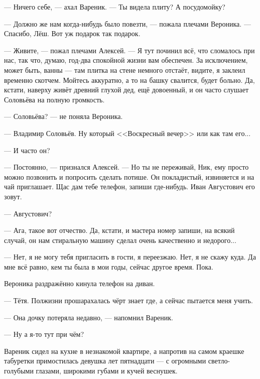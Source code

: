 \textspace

--- Ничего себе, --- ахал Вареник.
--- Ты видела плиту?
А посудомойку?

--- Должно же нам когда-нибудь было повезти, --- пожала плечами Вероника.
--- Спасибо, Лёш.
Вот уж подарок так подарок.

--- Живите, --- пожал плечами Алексей.
--- Я тут починил всё, что сломалось при нас, так что, думаю, год-два спокойной жизни вам обеспечен.
За исключением, может быть, ванны --- там плитка на стене немного отстаёт, видите, я заклеил временно скотчем.
Мойтесь аккуратно, а то на башку свалится, будет больно.
Да, кстати, наверху живёт древний глухой дед, ещё довоенный, и он часто слушает Соловьёва на полную громкость.

--- Соловьёва? --- не поняла Вероника.

--- Владимир Соловьёв.
Ну который <<Воскресный вечер>> или как там его...

--- И часто он?

--- Постоянно, --- признался Алексей.
--- Но ты не переживай, Ник, ему просто можно позвонить и попросить сделать потише.
Он покладистый, извиняется и на чай приглашает.
Щас дам тебе телефон, запиши где-нибудь.
Иван Августович его зовут.

--- Августович?

--- Ага, такое вот отчество.
Да, кстати, и мастера номер запиши, на всякий случай, он нам стиральную машину сделал очень качественно и недорого...

\asterism

\textspace

--- Нет, я не могу тебя пригласить в гости, я переезжаю.
Нет, я не скажу куда.
Да мне всё равно, кем ты была в мои годы, сейчас другое время.
Пока.

Вероника раздражённо кинула телефон на диван.

--- Тётя.
Полжизни прошарахалась чёрт знает где, а сейчас пытается меня учить.

--- Она дочку потеряла недавно, --- напомнил Вареник.

--- Ну а я-то тут при чём?

\textspace

\asterism

\textspace

Вареник сидел на кухне в незнакомой квартире, а напротив на самом краешке табуретки примостилась девушка лет пятнадцати --- с огромными светло-голубыми глазами, широкими губами и кучей веснушек.

